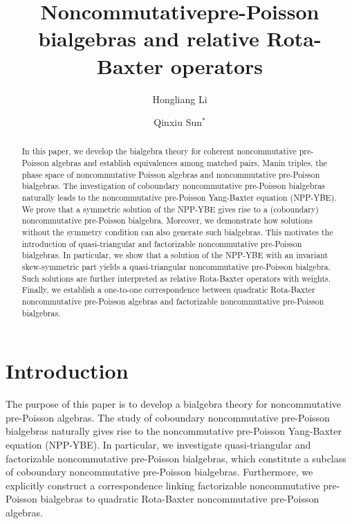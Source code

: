 \documentclass[12pt]{amsart}
\title[ Noncommutative pre-Poisson bialgebras and relative Rota-Baxter operators] {Noncommutativepre-Poisson bialgebras and relative Rota-Baxter operators}
\author{Hongliang Li}
\author{Qinxiu Sun$^*$}
\theoremstyle{definition}
\begin{document}
\begin{abstract}

In this paper, we develop the bialgebra theory for coherent noncommutative pre-Poisson algebras and 
establish equivalences among matched pairs, Manin triples, the phase space of noncommutative Poisson algebras
 and noncommutative pre-Poisson bialgebras.
The investigation of coboundary noncommutative pre-Poisson bialgebras naturally leads to
 the noncommutative pre-Poisson Yang-Baxter equation (NPP-YBE).
We prove that a symmetric solution of the NPP-YBE gives rise to a (coboundary) noncommutative 
pre-Poisson bialgebra. Moreover, we demonstrate how solutions without the symmetry 
condition can also generate such bialgebras. This motivates the introduction of quasi-triangular and 
factorizable noncommutative pre-Poisson bialgebras.
 In particular, we show that a solution of the NPP-YBE with an invariant skew-symmetric 
 part yields a quasi-triangular noncommutative pre-Poisson bialgebra. 
 Such solutions are further interpreted as relative Rota-Baxter operators with weights.
Finally, we establish a one-to-one correspondence between quadratic Rota-Baxter noncommutative pre-Poisson 
algebras and factorizable noncommutative pre-Poisson bialgebras.


\end{abstract}

\maketitle

\vspace{-1.2cm}

\tableofcontents

\vspace{-1.2cm}

\allowdisplaybreaks

\section{Introduction}

The purpose of this paper is to develop a bialgebra theory for noncommutative pre-Poisson algebras.
The study of coboundary noncommutative pre-Poisson bialgebras naturally gives rise to
 the noncommutative pre-Poisson Yang-Baxter equation (NPP-YBE).
 In particular, we investigate quasi-triangular and factorizable noncommutative pre-Poisson bialgebras,
  which constitute a subclass of coboundary noncommutative pre-Poisson bialgebras. 
Furthermore, we explicitly construct a correspondence linking factorizable noncommutative 
pre-Poisson bialgebras to quadratic Rota-Baxter noncommutative pre-Poisson algebras.  
\end{document}

